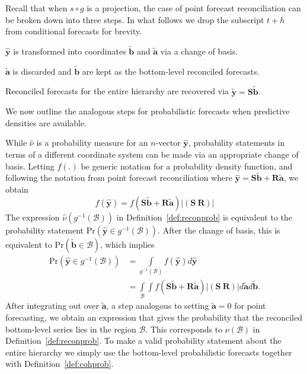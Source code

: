 \documentclass[12pt]{article}
\theoremstyle{definition}
\begin{document}
Recall that when $s\circ g$ is a projection, the case of point forecast reconciliation can be broken down into three steps. In what follows we drop the subscript $t+h$ from conditional forecasts for brevity.
\begin{compactenum}
	\item $\hat{\bm{y}}$ is transformed into coordinates $\tilde{\bm{b}}$ and $\tilde{\bm{a}}$ via a change of basis.
	\item $\tilde{\bm{a}}$ is discarded and $\tilde{\bm{b}}$ are kept as the bottom-level reconciled forecasts.
	\item Reconciled forecasts for the entire hierarchy are recovered via $\tilde{\bm{y}}=\bm{S}\tilde{\bm{b}}$.
\end{compactenum}

We now outline the analogous steps for probabilistic forecasts when predictive densities are available.

While $\hat{\nu}$ is a probability measure for an $n$-vector $\hat{\bm{y}}$, probability statements in terms of a different coordinate system can be made via an appropriate change of basis. Letting $f(.)$ be generic notation for a probability density function, and following the notation from point forecast reconciliation where $\hat{\bm{y}}=\bm{S}\tilde{\bm{b}}+\bm{R}\tilde{\bm{a}}$, we obtain
\begin{equation}
f(\hat{\bm{y}})=f(\bm{S}\tilde{\bm{b}}+\bm{R}\tilde{\bm{a}})|(\bm{S}~\bm{R})|
\end{equation}
The expression $\hat{\nu}(g^{-1}(\mathcal{B}))$ in Definition~\ref{def:reconprob} is equivalent to the probability statement $\text{Pr}(\hat{\bm{y}}\in g^{-1}(\mathcal{B}))$. After the change of basis, this is equivalent to $\text{Pr}(\tilde{\bm{b}}\in \mathcal{B})$, which implies
\begin{align}
	\text{Pr}(\hat{\bm{y}}\in g^{-1}(\mathcal{B}))&=\int\limits_{g^{-1}(\mathcal{B})}f(\hat{\bm{y}})d\hat{\bm{y}}\\
	&=\int\limits_{\mathcal{B}}\int f(\bm{S}\tilde{\bm{b}}
	+\bm{R}\tilde{\bm{a}})|(\bm{S}~\bm{R})|d\tilde{\bm{a}}d\tilde{\bm{b}}.
\end{align}
After integrating out over $\tilde{\bm{a}}$, a step analogous to setting $\tilde{\bm{a}}=0$ for point forecasting, we obtain an expression that gives the probability that the reconciled bottom-level series lies in the region $\mathcal{B}$. This corresponds to $\nu(\mathcal{B})$ in Definition~\ref{def:reconprob}. To make a valid probability statement about the entire hierarchy we simply use the bottom-level probabilistic forecasts together with Definition~\ref{def:cohprob}.
\end{document}
